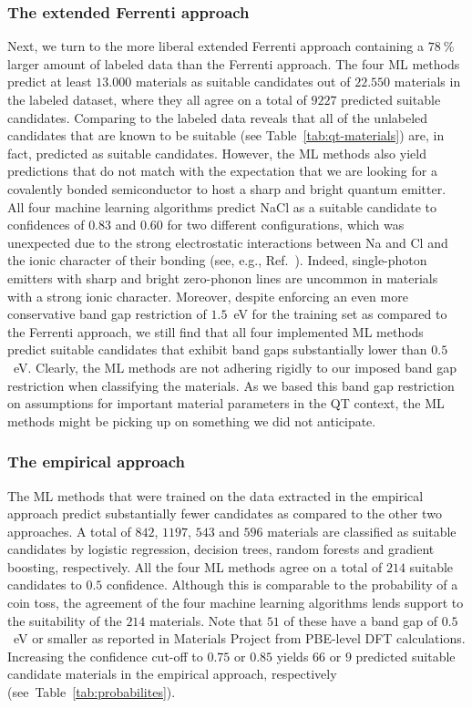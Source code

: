 \documentclass[superscriptaddress,unsortedaddress,
 amsmath,amssymb,
 aps,
]{revtex4-2}
\begin{document}
\subsubsection*{The extended Ferrenti approach}
Next, we turn to the more liberal extended Ferrenti approach containing a $78 \ \%$ larger 
amount of labeled data  
than the Ferrenti approach.  
The four ML methods predict at least $13.000$ materials as suitable candidates out of $22.550$ materials in the labeled dataset, where they all agree on a total of $9227$ predicted suitable candidates. Comparing to the labeled data reveals that all of the unlabeled candidates that are known to be suitable (see Table~\ref{tab:qt-materials}) are, in fact, predicted as suitable candidates. 
However, the ML methods also yield predictions that do not match with the expectation that we are looking for a covalently bonded semiconductor to host a sharp and bright quantum emitter. 
% 
All four machine learning algorithms predict NaCl as a suitable candidate to confidences of $0.83$ and $0.60$ for two different configurations,  which was unexpected due to the strong electrostatic interactions between Na and Cl and the ionic character of their bonding (see, e.g., Ref.~\cite{Weber2010}).  
Indeed, single-photon emitters with sharp and bright zero-phonon lines are uncommon in materials with a strong ionic character. 
Moreover, despite enforcing an even more conservative band gap restriction of $1.5$~eV for the training set as compared to the Ferrenti approach, we still find that all four implemented ML methods predict suitable candidates that exhibit band gaps substantially lower than $0.5$~eV. 
Clearly, the ML methods are not adhering rigidly to our imposed band gap restriction when classifying the materials. 
As we based this band gap restriction on assumptions for important material parameters in the QT context, the ML methods might be picking up on something we did not anticipate. 

 
\subsubsection*{The empirical approach}
The ML methods that were trained on the data extracted in the empirical approach predict substantially fewer candidates as compared to the other two approaches. 
A total of $842$, $1197$, $543$ and $596$ materials are classified as suitable candidates by logistic regression, decision trees, random forests and gradient boosting, respectively. All the four ML methods agree on a total of $214$ suitable candidates to $0.5$ confidence.   
Although this is comparable to the probability of a coin toss, the agreement of the four machine learning algorithms lends support to the suitability of the $214$ materials. 
Note that $51$ of these have a band gap of $0.5$~eV or smaller as reported in Materials Project from PBE-level DFT calculations.  Increasing the confidence cut-off to $0.75$ or $0.85$ yields $66$ or $9$ predicted suitable candidate materials in the empirical approach, respectively (see~Table~\ref{tab:probabilites}). 
\end{document}

